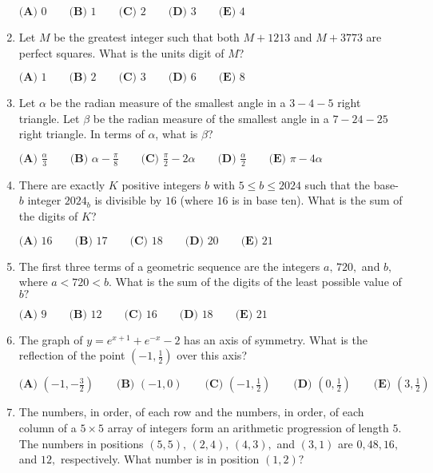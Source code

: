\documentclass{article}
\begin{document}
\begin{enumerate}[label=\arabic*., itemsep=0.5em]
$ \textbf{(A) }0 \qquad \textbf{(B) }1 \qquad \textbf{(C) }2 \qquad \textbf{(D) }3 \qquad \textbf{(E) }4 \qquad $\par \vspace{0.5em}\item Let $M$ be the greatest integer such that both $M + 1213$ and $M + 3773$ are perfect squares. What is the units digit of $M$?

$
\textbf{(A) }1 \qquad
\textbf{(B) }2 \qquad
\textbf{(C) }3 \qquad
\textbf{(D) }6 \qquad
\textbf{(E) }8 \qquad
$\par \vspace{0.5em}\item Let $\alpha$ be the radian measure of the smallest angle in a $3{-}4{-}5$ right triangle. Let $\beta$ be the radian measure of the smallest angle in a $7{-}24{-}25$ right triangle. In terms of $\alpha$, what is $\beta$?

$
\textbf{(A) }\frac{\alpha}{3}\qquad
\textbf{(B) }\alpha - \frac{\pi}{8}\qquad
\textbf{(C) }\frac{\pi}{2} - 2\alpha \qquad
\textbf{(D) }\frac{\alpha}{2}\qquad
\textbf{(E) }\pi - 4\alpha\qquad
$\par \vspace{0.5em}\item There are exactly $K$ positive integers $b$ with $5 \leq b \leq 2024$ such that the base-$b$ integer $2024_b$ is divisible by $16$ (where $16$ is in base ten). What is the sum of the digits of $K$?

$\textbf{(A) }16\qquad\textbf{(B) }17\qquad\textbf{(C) }18\qquad\textbf{(D) }20\qquad\textbf{(E) }21$\par \vspace{0.5em}\item The first three terms of a geometric sequence are the integers $a,\,720,$ and $b,$ where $a<720<b.$ What is the sum of the digits of the least possible value of $b?$

$\textbf{(A) } 9 \qquad \textbf{(B) } 12 \qquad \textbf{(C) } 16 \qquad \textbf{(D) } 18 \qquad \textbf{(E) } 21$\par \vspace{0.5em}\item The graph of $y=e^{x+1}+e^{-x}-2$ has an axis of symmetry. What is the reflection of the point $(-1,\tfrac{1}{2})$ over this axis?

$\textbf{(A) }\left(-1,-\frac{3}{2}\right)\qquad\textbf{(B) }(-1,0)\qquad\textbf{(C) }\left(-1,\tfrac{1}{2}\right)\qquad\textbf{(D) }\left(0,\frac{1}{2}\right)\qquad\textbf{(E) }\left(3,\frac{1}{2}\right)$\par \vspace{0.5em}\item The numbers, in order, of each row and the numbers, in order, of each column of a $5 \times 5$ array of integers form an arithmetic progression of length $5{.}$ The numbers in positions $(5, 5), \,(2,4),\,(4,3),$ and $(3, 1)$ are $0, 48, 16,$ and $12{,}$ respectively. What number is in position $(1, 2)?$


\end{enumerate}
\end{document}
